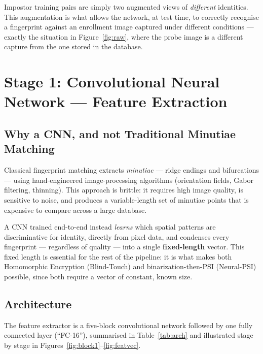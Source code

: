 \documentclass[11pt]{article}
\begin{document}
Impostor training pairs are simply two augmented views of \emph{different} identities.
This augmentation is what allows the network, at test time, to correctly recognise a
fingerprint against an enrollment image captured under different conditions --- exactly
the situation in Figure~\ref{fig:raw}, where the probe image is a different capture from
the one stored in the database.

\section{Stage 1: Convolutional Neural Network --- Feature Extraction}

\subsection{Why a CNN, and not Traditional Minutiae Matching}

Classical fingerprint matching extracts \emph{minutiae} --- ridge endings and bifurcations
--- using hand-engineered image-processing algorithms (orientation fields, Gabor filtering,
thinning). This approach is brittle: it requires high image quality, is sensitive to noise,
and produces a variable-length set of minutiae points that is expensive to compare across
a large database.

A CNN trained end-to-end instead \emph{learns} which spatial patterns are discriminative
for identity, directly from pixel data, and condenses every fingerprint --- regardless of
quality --- into a single \textbf{fixed-length} vector. This fixed length is essential for
the rest of the pipeline: it is what makes both Homomorphic Encryption (Blind-Touch) and
binarization-then-PSI (Neural-PSI) possible, since both require a vector of constant,
known size.

\subsection{Architecture}

The feature extractor is a five-block convolutional network followed by one fully
connected layer (``FC-16''), summarised in Table~\ref{tab:arch} and illustrated stage by
stage in Figures~\ref{fig:block1}--\ref{fig:featvec}.
\end{document}
